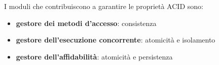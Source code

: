 \bigskip
I moduli che contribuiscono a garantire le proprietà ACID sono:
\begin{itemize}[label=$\circ$, itemsep=\smallskipamount]
  \item \textbf{gestore dei metodi d'accesso}: consistenza
  \item \textbf{gestore dell'esecuzione concorrente}: atomicità e isolamento
  \item \textbf{gestore dell'affidabilità}: atomicità e persistenza  
\end{itemize}